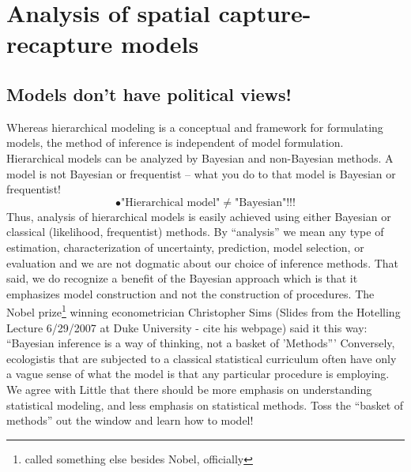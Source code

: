 \section{Analysis of spatial capture-recapture models}





\subsection{Models don't have political views!}

Whereas hierarchical modeling is a conceptual and framework for
formulating models, the method of inference is independent of model
formulation. Hierarchical models can be analyzed by Bayesian and
non-Bayesian methods. A model is not Bayesian or frequentist -- what
you do to that model is Bayesian or frequentist!
\[
\bullet \mbox{"Hierarchical model"} \ne  \mbox{"Bayesian"}!!!
\]
Thus, analysis of hierarchical models is easily achieved using either
Bayesian or classical (likelihood, frequentist) methods. By
``analysis'' we mean any type of estimation, characterization of
uncertainty, prediction, model selection, or evaluation and we are not
dogmatic about our choice of inference methods. That said, we do
recognize a benefit of the Bayesian approach which is that it
emphasizes model construction and not the construction of
procedures. The Nobel prize\footnote{called something else besides
  Nobel, officially} winning econometrician Christopher Sims (Slides
from the Hotelling Lecture 6/29/2007 at Duke University - cite his
webpage) said it this way: ``Bayesian inference is a way of thinking,
not a basket of 'Methods''' Conversely, ecologistis that are subjected
to a classical statistical curriculum often have only a vague sense of
what the model is that any particular procedure is employing.  We
agree with Little \citet{little:2006}
that there should be more emphasis on understanding statistical
modeling, and less emphasis on statistical methods.  Toss the ``basket
of methods'' out the window and learn how to model!


